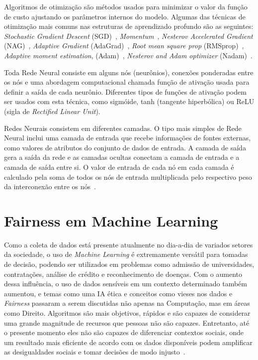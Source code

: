 \documentclass[portugues]{ic-tese}
\begin{document}
Algoritmos de otimização são métodos usados para minimizar o valor da função de custo ajustando os parâmetros internos do modelo. Algumas das técnicas de otimização mais comuns nas estruturas de aprendizado profundo são as seguintes: \textit{Stochastic Gradient Descent} (SGD)~\citep{Schmidt_2013}, \textit{Momentum}~\citep{Polyak_1964}, \textit{Nesterov Accelerated Gradient} (NAG)~\citep{Sutskever_2013}, \textit{Adaptive Gradient} (AdaGrad)~\citep{Duchi_2011}, \textit{Root mean square prop} (RMSprop)~\citep{Graves_2013}, \textit{Adaptive moment estimation}, (Adam)~\citep{Kingma_2014}, \textit{Nesterov and Adam optimizer} (Nadam)~\citep{Dozat_2016}.

Toda Rede Neural consiste em alguns nós (neurônios), conexões ponderadas entre os nós e uma abordagem computacional chamada função de ativação usada para definir a saída de cada neurônio. Diferentes tipos de funções de ativação podem ser usados com esta técnica, como sigmóide, tanh (tangente hiperbólica) ou ReLU (sigla de \textit{Rectified Linear Unit}).

Redes Neurais consistem em diferentes camadas. O tipo mais simples de Rede Neural inclui uma camada de entrada que recebe informações de fontes externas, como valores de atributos do conjunto de dados de entrada. A camada de saída gera a saída da rede e as camadas ocultas conectam a camada de entrada e a camada de saída entre si. O valor de entrada de cada nó em cada camada é calculado pela soma de todos os nós de entrada multiplicada pelo respectivo peso da interconexão entre os nós~\citep{Erb_1993}.

\section{Fairness em Machine Learning}

Como a coleta de dados está presente atualmente no dia-a-dia de variados setores da sociedade, o uso de \textit{Machine Learning} é extremamente versátil para tomadas de decisão, podendo ser utilizados em problemas como admissão de universidades, contratações, análise de crédito e reconhecimento de doenças. Com o aumento dessa influência, o uso de dados sensíveis em um contexto determinado também aumentou, e temas como uma IA ética e conceitos como vieses nos dados e \textit{Fairness} passaram a serem discutidas não apenas na Computação, mas em áreas como Direito. Algoritmos são mais objetivos, rápidos e são capazes de considerar uma grande magnitude de recursos que pessoas não são capazes. Entretanto, até o presente momento eles não são capazes de diferenciar contextos sociais, onde um resultado mais eficiente de acordo com os dados disponíveis podem amplificar as desigualdades sociais e tomar decisões de modo injusto~\citep{Mehrabi_2021}. 
\end{document}
